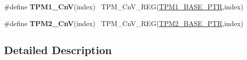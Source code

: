 \begin{DoxyCompactItemize}
\item 
\hypertarget{group___t_p_m___register___accessor___macros_gace974defb4b116f32ccc9a2bb377269c}{}\#define {\bfseries T\+P\+M1\+\_\+\+Cn\+V}(index)                                                ~T\+P\+M\+\_\+\+Cn\+V\+\_\+\+R\+E\+G(\hyperlink{group___t_p_m___peripheral_ga3c3f533f8c87c74f2bbc3a4de83d1181}{T\+P\+M1\+\_\+\+B\+A\+S\+E\+\_\+\+P\+T\+R},index)\label{group___t_p_m___register___accessor___macros_gace974defb4b116f32ccc9a2bb377269c}

\item 
\hypertarget{group___t_p_m___register___accessor___macros_gaeb66a58b518738992bc74d847c244ae8}{}\#define {\bfseries T\+P\+M2\+\_\+\+Cn\+V}(index)                                                ~T\+P\+M\+\_\+\+Cn\+V\+\_\+\+R\+E\+G(\hyperlink{group___t_p_m___peripheral_ga37cc120e7475fb646fe9bc15b57f06bc}{T\+P\+M2\+\_\+\+B\+A\+S\+E\+\_\+\+P\+T\+R},index)\label{group___t_p_m___register___accessor___macros_gaeb66a58b518738992bc74d847c244ae8}

\end{DoxyCompactItemize}


\subsection{Detailed Description}

